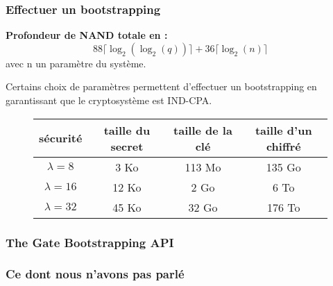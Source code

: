 \documentclass[11pt,xcolor={usenames,dvipsnames}]{beamer}
\begin{document}

\begin{frame} 
\frametitle{Effectuer un bootstrapping}

\textbf{Profondeur de NAND totale en :} \
\[88 \lceil \log_2(\log_2(q)) \rceil + 36 \lceil \log_2(n) \rceil\]
avec n un paramètre du système.

Certains choix de paramètres permettent d'effectuer un bootstrapping en garantissant que le cryptosystème est IND-CPA.
\pause

\begin{figure}
\begin{tabular}{|c|c|c|c|}
\hline
sécurité & taille du secret & taille de la clé & taille d'un chiffré \\
\hline
$\lambda = 8$ & 3 Ko & 113 Mo & 135 Go \\
\hline
$\lambda = 16$ & 12 Ko & 2 Go & 6 To \\
\hline
$\lambda = 32$ & 45 Ko & 32 Go & 176 To \\
\hline
\end{tabular}
\end{figure}
\end{frame}


\begin{frame} 
\frametitle{The Gate Bootstrapping API}
\end{frame} 


\begin{frame}
\frametitle{Ce dont nous n'avons pas parlé}
\end{frame}

\end{document}
